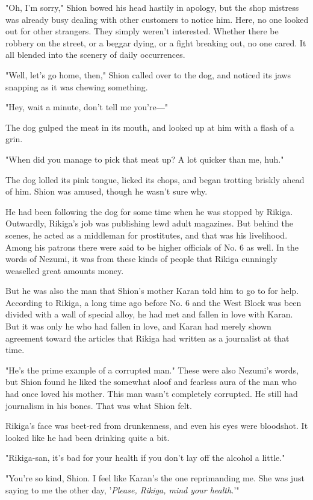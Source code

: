 "Oh, I'm sorry," Shion bowed his head hastily in apology, but the shop
mistress was already busy dealing with other customers to notice him.
Here, no one looked out for other strangers. They simply weren't
interested. Whether there be robbery on the street, or a beggar dying,
or a fight breaking out, no one cared. It all blended into the scenery
of daily occurrences.

"Well, let's go home, then," Shion called over to the dog, and noticed
its jaws snapping as it was chewing something.

"Hey, wait a minute, don't tell me you're―"

The dog gulped the meat in its mouth, and looked up at him with a flash
of a grin.

"When did you manage to pick that meat up? A lot quicker than me, huh."

The dog lolled its pink tongue, licked its chops, and began trotting
briskly ahead of him. Shion was amused, though he wasn't sure why.

He had been following the dog for some time when he was stopped by
Rikiga. Outwardly, Rikiga's job was publishing lewd adult magazines. But
behind the scenes, he acted as a middleman for prostitutes, and that was
his livelihood. Among his patrons there were said to be higher officials
of No. 6 as well. In the words of Nezumi, it was from these kinds of
people that Rikiga cunningly weaselled great amounts money.

But he was also the man that Shion's mother Karan told him to go to for
help. According to Rikiga, a long time ago before No. 6 and the West
Block was been divided with a wall of special alloy, he had met and
fallen in love with Karan. But it was only he who had fallen in love,
and Karan had merely shown agreement toward the articles that Rikiga had
written as a journalist at that time.

"He's the prime example of a corrupted man." These were also Nezumi's
words, but Shion found he liked the somewhat aloof and fearless aura of
the man who had once loved his mother. This man wasn't completely
corrupted. He still had journalism in his bones. That was what Shion
felt.

Rikiga's face was beet-red from drunkenness, and even his eyes were
bloodshot. It looked like he had been drinking quite a bit.

"Rikiga-san, it's bad for your health if you don't lay off the alcohol a
little."

"You're so kind, Shion. I feel like Karan's the one reprimanding me. She
was just saying to me the other day, '\emph{Please, Rikiga, mind your
health.}'"

